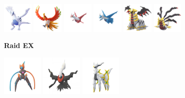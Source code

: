 \documentclass[12pt]{beamer}
\begin{document}
\begin{frame}
\begin{block}{}
\begin{footnotesize}
\begin{center}
 \includegraphics[width=1.5cm]{../../images/pokemon/lugia.png}\quad\quad
 \includegraphics[width=1.5cm]{../../images/pokemon/ho-oh.png}\quad\quad
 \includegraphics[width=1.5cm]{../../images/pokemon/latias.png}\quad\quad
 \includegraphics[width=1.5cm]{../../images/pokemon/latios.png}\quad\quad
 \includegraphics[width=1.5cm]{../../images/pokemon/giratina_a.png}\quad\quad
 \includegraphics[width=1.5cm]{../../images/pokemon/giratina_o.png}


\bigskip\bigskip

\textbf{Raid EX}

 \includegraphics[width=2cm]{../../images/pokemon/deoxys_s.png}\quad\quad
 \includegraphics[width=2cm]{../../images/pokemon/darkrai.png}\quad\quad
 \includegraphics[width=2cm]{../../images/pokemon/arceus_neutral.png} 

\end{center}

\end{footnotesize}
\end{block}
\end{frame}
\end{document}
